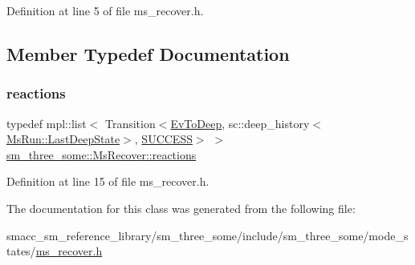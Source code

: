 Definition at line 5 of file ms\+\_\+recover.\+h.



\subsection{Member Typedef Documentation}
\mbox{\label{classsm__three__some_1_1MsRecover_ab41d65bcc8f575199685a12431962bed}} 
\subsubsection{\texorpdfstring{reactions}{reactions}}
{\footnotesize\ttfamily typedef mpl\+::list$<$ Transition$<$\hyperlink{structsm__three__some_1_1EvToDeep}{Ev\+To\+Deep}, sc\+::deep\+\_\+history$<$\hyperlink{classsmacc_1_1SmaccState_a60088405d2d99d468caa0baa3b2830a8}{Ms\+Run\+::\+Last\+Deep\+State}$>$, \hyperlink{classSUCCESS}{S\+U\+C\+C\+E\+SS}$>$ $>$ \hyperlink{classsm__three__some_1_1MsRecover_ab41d65bcc8f575199685a12431962bed}{sm\+\_\+three\+\_\+some\+::\+Ms\+Recover\+::reactions}}



Definition at line 15 of file ms\+\_\+recover.\+h.



The documentation for this class was generated from the following file\+:\begin{DoxyCompactItemize}
\item 
smacc\+\_\+sm\+\_\+reference\+\_\+library/sm\+\_\+three\+\_\+some/include/sm\+\_\+three\+\_\+some/mode\+\_\+states/\hyperlink{sm__three__some_2include_2sm__three__some_2mode__states_2ms__recover_8h}{ms\+\_\+recover.\+h}\end{DoxyCompactItemize}
